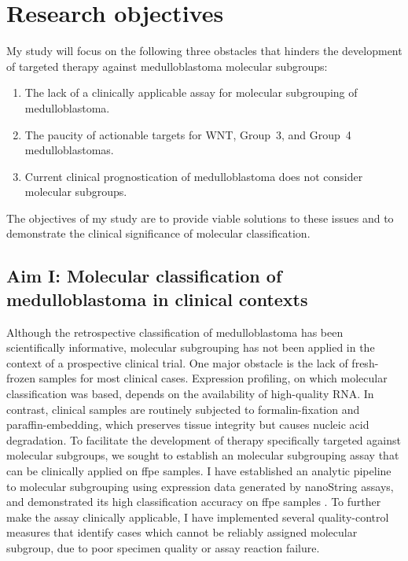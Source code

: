 \section{Research objectives}

My study will focus on the following three obstacles that hinders the development of targeted therapy against medulloblastoma molecular subgroups:

\begin{enumerate}
	\item The lack of a clinically applicable assay for molecular subgrouping of medulloblastoma.
	\item The paucity of actionable targets for WNT, Group~3, and Group~4 medulloblastomas.
	\item Current clinical prognostication of medulloblastoma does not consider molecular subgroups.
\end{enumerate}

The objectives of my study are to provide viable solutions to these issues and to demonstrate the clinical significance of molecular classification.


\subsection*{Aim I: Molecular classification of medulloblastoma in clinical contexts}

Although the retrospective classification of medulloblastoma has been scientifically informative, molecular subgrouping has not been applied in the context of a prospective clinical trial. One major obstacle is the lack of fresh-frozen samples for most clinical cases. Expression profiling, on which molecular classification was based, depends on the availability of high-quality RNA. In contrast, clinical samples are routinely subjected to formalin-fixation and paraffin-embedding, which preserves tissue integrity but causes nucleic acid degradation. To facilitate the development of therapy specifically targeted against molecular subgroups, we sought to establish an molecular subgrouping assay that can be clinically applied on \gls{ffpe} samples. I have established an analytic pipeline to molecular subgrouping using expression data generated by nanoString assays, and demonstrated its high classification accuracy on \gls{ffpe} samples . To further make the assay clinically applicable, I have implemented several quality-control measures that identify cases which cannot be reliably assigned molecular subgroup, due to poor specimen quality or assay reaction failure.

